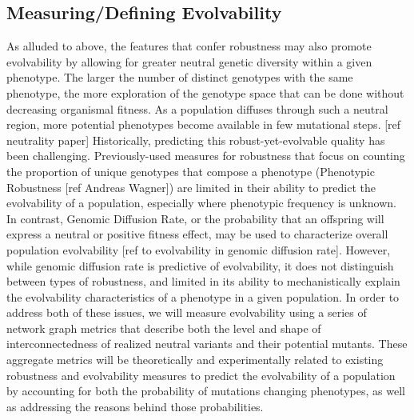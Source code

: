 \subsection{Measuring/Defining Evolvability}

As alluded to above, the features that confer robustness may also promote evolvability by allowing for greater neutral genetic diversity within a given phenotype. The larger the number of distinct genotypes with the same phenotype, the more exploration of the genotype space that can be done without decreasing organismal fitness. As a population diffuses through such a neutral region, more potential phenotypes become available in few mutational steps. [ref neutrality paper]
Historically, predicting this robust-yet-evolvable quality has been challenging. Previously-used measures for robustness that focus on counting the proportion of unique genotypes that compose a phenotype (Phenotypic Robustness [ref Andreas Wagner]) are limited in their ability to predict the evolvability of a population, especially where phenotypic frequency is unknown. 
In contrast, Genomic Diffusion Rate, or the probability that an offspring will express a neutral or positive fitness effect, may be used to characterize overall population evolvability [ref to evolvability in genomic diffusion rate]. However, while genomic diffusion rate is predictive of evolvability, it does not distinguish between types of robustness, and limited in its ability to mechanistically explain the evolvability characteristics of a phenotype in a given population. 
In order to address both of these issues, we will measure evolvability using a series of network graph metrics that describe both the level and shape of interconnectedness of realized neutral variants and their potential mutants. These aggregate metrics will be theoretically and experimentally related to existing robustness and evolvability measures to predict the evolvability of a population by accounting for both the probability of mutations changing phenotypes, as well as addressing the reasons behind those probabilities.


